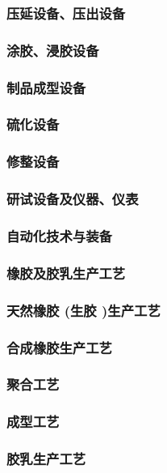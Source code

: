 \documentclass[UTF8]{../../ApplicationUniverse}
\begin{document}
        \subsubsection{压延设备、压出设备}
        \subsubsection{涂胶、浸胶设备}
        \subsubsection{制品成型设备}
        \subsubsection{硫化设备}
            \subsubsection{修整设备}
            \subsubsection{研试设备及仪器、仪表}
            \subsubsection{自动化技术与装备}
    \subsubsection{橡胶及胶乳生产工艺}
        \subsubsection{天然橡胶 (生胶 )生产工艺}
        \subsubsection{合成橡胶生产工艺}
            \subsubsection{聚合工艺}
            \subsubsection{成型工艺}
        \subsubsection{胶乳生产工艺}
\end{document}

